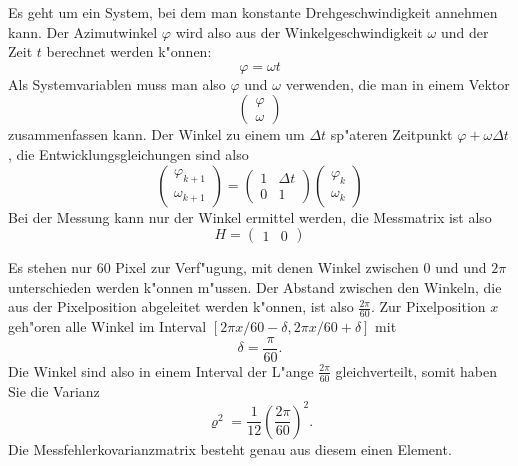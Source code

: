 \begin{loesung}
\begin{teilaufgaben}
\item
Es geht um ein System, bei dem man konstante Drehgeschwindigkeit annehmen
kann. Der Azimutwinkel $\varphi$ wird also aus der Winkelgeschwindigkeit
$\omega$ und der Zeit $t$ berechnet werden k"onnen:
\[
\varphi=\omega t
\]
Als Systemvariablen muss man also $\varphi$ und $\omega$ verwenden,
die man in einem Vektor
\[
\begin{pmatrix}\varphi\\\omega\end{pmatrix}
\]
zusammenfassen kann. Der Winkel zu einem um $\Delta t$ sp"ateren Zeitpunkt
$\varphi+\omega\Delta t$, die Entwicklungsgleichungen sind also
\[
\begin{pmatrix}\varphi_{k+1}\\\omega_{k+1}\end{pmatrix}
=\begin{pmatrix}1&\Delta t\\0&1\end{pmatrix}
\begin{pmatrix}\varphi_k\\\omega_k\end{pmatrix}
\]
Bei der Messung kann nur der Winkel ermittel werden, die Messmatrix ist
also
\[
H=\begin{pmatrix}1&0\end{pmatrix}
\]
\item
Es stehen nur 60 Pixel zur Verf"ugung, mit denen Winkel zwischen $0$ und
und $2\pi$ unterschieden werden k"onnen m"ussen.
Der Abstand zwischen den Winkeln, die aus der Pixelposition abgeleitet
werden k"onnen, ist also $\frac{2\pi}{60}$. Zur Pixelposition $x$ geh"oren
alle Winkel im Interval $[2\pi x/60-\delta, 2\pi x/60+\delta]$ mit
\[
\delta=\frac{\pi}{60}.
\]
Die Winkel sind also in einem Interval der L"ange $\frac{2\pi}{60}$ gleichverteilt,
somit haben Sie die Varianz
\[
\varrho^2=\frac1{12}\left(\frac{2\pi}{60}\right)^2.
\]
Die Messfehlerkovarianzmatrix besteht genau aus diesem einen Element.
\qedhere
\end{teilaufgaben}
\end{loesung}

